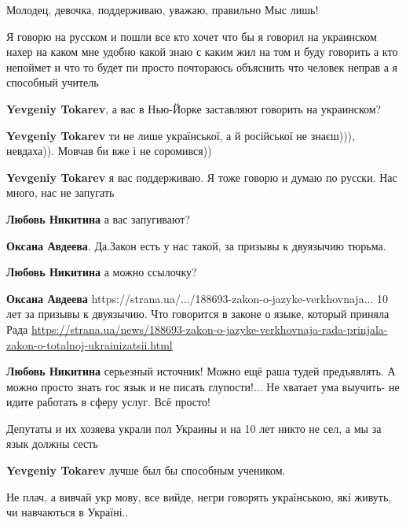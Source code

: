 \begin{itemize}
{

Молодец, девочка, поддерживаю, уважаю, правильно Мыс лишь!


Я говорю на русском и пошли все кто хочет что бы я говорил на украинском нахер
на каком мне удобно какой знаю с каким жил на том и буду говорить а кто
непоймет и что то будет пи просто почтораюсь объяснить что человек неправ а я
способный учитель

\begin{itemize}
\textbf{Yevgeniy Tokarev}, а вас в Нью-Йорке заставляют говорить на украинском?

\textbf{Yevgeniy Tokarev} ти не лише української, а й російської не знаєш))), невдаха)). Мовчав би вже і не соромився))

\textbf{Yevgeniy Tokarev} я вас поддерживаю. Я тоже говорю и думаю по русски. Нас много, нас не запугать

\textbf{Любовь Никитина} а вас запугивают?

\textbf{Оксана Авдеева}. Да.Закон есть у нас такой, за призывы к двуязычию тюрьма.

\textbf{Любовь Никитина} а можно ссылочку?

\textbf{Оксана Авдеева} https://strana.ua/.../188693-zakon-o-jazyke-verkhovnaja...
10 лет за призывы к двуязычию. Что говорится в законе о языке, который приняла Рада
\url{https://strana.ua/news/188693-zakon-o-jazyke-verkhovnaja-rada-prinjala-zakon-o-totalnoj-ukrainizatsii.html}

\textbf{Любовь Никитина} серьезный источник!
Можно ещё раша тудей предъявлять.
А можно просто знать гос язык и не писать глупости!... 
Не хватает ума выучить- не идите работать в сферу услуг.
Всё просто!

Депутаты и их хозяева украли пол Украины и на 10 лет никто не сел, а мы за язык должны сесть

\textbf{Yevgeniy Tokarev} лучше был бы способным учеником.
\end{itemize}


Не плач, а вивчай укр мову, все вийде, негри говорять українською, які живуть,
чи навчаються в Україні..

\begin{itemize}


\end{itemize}}
\end{itemize}
